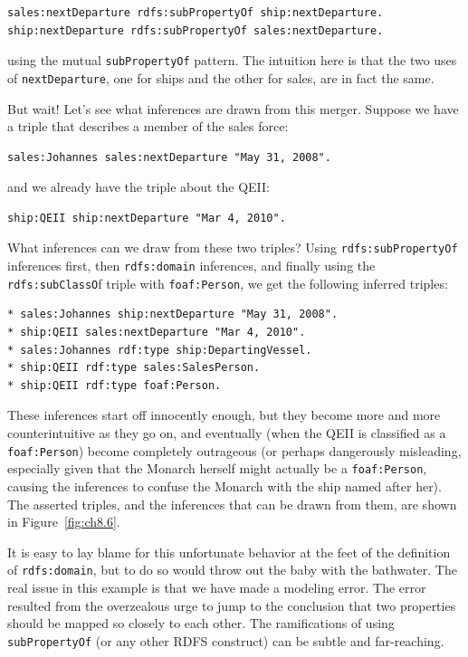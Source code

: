 \begin{lstlisting}
sales:nextDeparture rdfs:subPropertyOf ship:nextDeparture.
ship:nextDeparture rdfs:subPropertyOf sales:nextDeparture.
\end{lstlisting}

using the mutual \texttt{subPropertyOf} pattern. The intuition here is that the
two uses of
\texttt{nextDeparture}, one for ships and the other for sales, are in fact the
same.

But wait! Let's see what inferences are drawn from this merger. Suppose
we have a triple that describes a member of the sales force:

\begin{lstlisting}
sales:Johannes sales:nextDeparture "May 31, 2008".
\end{lstlisting}

and we already have the triple about the QEII:

\begin{lstlisting}
ship:QEII ship:nextDeparture "Mar 4, 2010".
\end{lstlisting}

What inferences can we draw from these two triples? Using
\texttt{rdfs:subPropertyOf} inferences first, then \texttt{rdfs:domain} inferences, and
finally using the \texttt{rdfs:subClassO}f triple with \texttt{foaf:Person}, we get the
following inferred triples:

\begin{lstlisting}
* sales:Johannes ship:nextDeparture "May 31, 2008".
* ship:QEII sales:nextDeparture "Mar 4, 2010".
* sales:Johannes rdf:type ship:DepartingVessel.
* ship:QEII rdf:type sales:SalesPerson.
* ship:QEII rdf:type foaf:Person.
\end{lstlisting}


These inferences start off innocently enough, but they become more and
more counterintuitive as they go on, and eventually (when the QEII is
classified as a \texttt{foaf:Person}) become completely outrageous (or perhaps
dangerously misleading, especially given that the Monarch herself might
actually be a \texttt{foaf:Person}, causing the inferences to confuse the Monarch
with the ship named after her). The asserted triples, and the inferences
that can be drawn from them, are shown in Figure~\ref{fig:ch8.6}.

It is easy to lay blame for this unfortunate behavior at the feet of the
definition of \texttt{rdfs:domain}, but to do so would throw out the baby with
the bathwater. The real issue in this example is that we have made a
modeling error. The error resulted from the overzealous urge to jump to
the conclusion that two properties should be mapped so closely to each
other. The ramifications of using \texttt{subPropertyOf} (or any other RDFS
construct) can be subtle and far-reaching.

